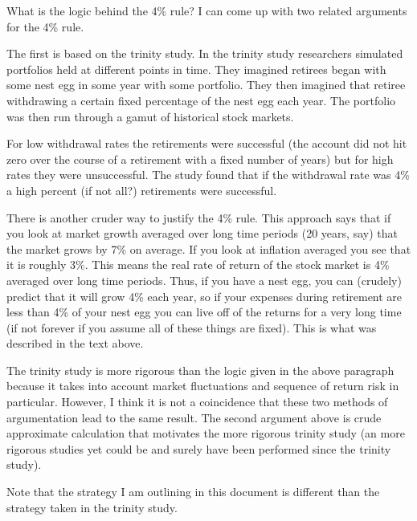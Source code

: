 \documentclass[12pt]{article}
\begin{document}
What is the logic behind the 4\% rule?
I can come up with two related arguments for the 4\% rule.

The first is based on the trinity study.
In the trinity study researchers simulated portfolios held at different points in time.
They imagined retirees began with some nest egg in some year with some portfolio.
They then imagined that retiree withdrawing a certain fixed percentage of the nest egg each year.
The portfolio was then run through a gamut of historical stock markets.

For low withdrawal rates the retirements were successful (the account did not hit zero over the course of a retirement with a fixed number of years) but for high rates they were unsuccessful. 
The study found that if the withdrawal rate was 4\% a high percent (if not all?) retirements were successful.

There is another cruder way to justify the 4\% rule.
This approach says that if you look at market growth averaged over long time periods (20 years, say) that the market grows by 7\% on average.
If you look at inflation averaged you see that it is roughly 3\%.
This means the real rate of return of the stock market is 4\% averaged over long time periods.
Thus, if you have a nest egg, you can (crudely) predict that it will grow 4\% each year, so if your expenses during retirement are less than 4\% of your nest egg you can live off of the returns for a very long time (if not forever if you assume all of these things are fixed).
This is what was described in the text above.

The trinity study is more rigorous than the logic given in the above paragraph because it takes into account market fluctuations and sequence of return risk in particular.
However, I think it is not a coincidence that these two methods of argumentation lead to the same result.
The second argument above is crude approximate calculation that motivates the more rigorous trinity study (an more rigorous studies yet could be and surely have been performed since the trinity study).

Note that the strategy I am outlining in this document is different than the strategy taken in the trinity study.
\end{document}
